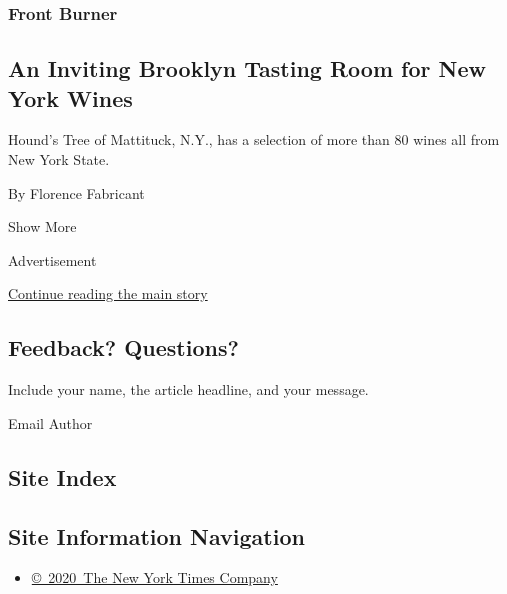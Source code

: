 \begin{enumerate}
  \hypertarget{front-burner-6}{%
  \subsubsection{Front Burner}\label{front-burner-6}}

  \hypertarget{an-inviting-brooklyn-tasting-room-for-new-york-wines}{%
  \subsection{An Inviting Brooklyn Tasting Room for New York
  Wines}\label{an-inviting-brooklyn-tasting-room-for-new-york-wines}}

  Hound's Tree of Mattituck, N.Y., has a selection of more than 80 wines
  all from New York State.

  By Florence Fabricant
\end{enumerate}

Show More

Advertisement

\protect\hyperlink{after-mid2}{Continue reading the main story}

\hypertarget{feedback-questions}{%
\subsection{Feedback? Questions?}\label{feedback-questions}}

Include your name, the article headline, and your message.

Email Author

\hypertarget{site-index}{%
\subsection{Site Index}\label{site-index}}

\hypertarget{site-information-navigation}{%
\subsection{Site Information
Navigation}\label{site-information-navigation}}

\begin{itemize}
\tightlist
\item
  \href{https://help.nytimes3xbfgragh.onion/hc/en-us/articles/115014792127-Copyright-notice}{©~2020~The
  New York Times Company}
\end{itemize}


